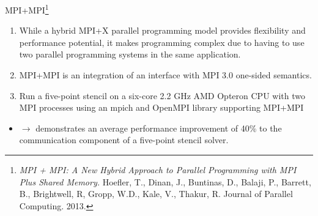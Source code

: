 \begin{frame}{MPI+MPI\footnote{\tiny {\it MPI + MPI: A New Hybrid Approach to Parallel Programming with MPI Plus Shared Memory.} Hoefler, T., Dinan, J., Buntinas, D., Balaji, P., Barrett, B., Brightwell, R, Gropp, W.D., Kale, V., Thakur, R.  Journal of 	Parallel Computing. 2013.}}
\vspace*{-.1in}
\begin{enumerate}
  \footnotesize \item \footnotesize {} While a hybrid MPI+X parallel programming model provides flexibility and performance potential, it makes programming complex due to having to use two parallel programming systems in the same application.
   \item \footnotesize {} MPI+MPI is an integration of an interface with MPI 3.0 one-sided semantics. 
   \item \footnotesize {} Run a five-point stencil on a six-core 2.2 GHz AMD Opteron CPU with two MPI processes using an mpich and OpenMPI library supporting MPI+MPI
\end{enumerate}
\vspace*{-0.3in}
\begin{figure}[ht!]
\label{fig:stencilMPIMPIbgq}
\end{figure}
\vspace*{-.15in}
\begin{itemize}
 \item[] \footnotesize $\rightarrow$ demonstrates an average performance improvement of 40\% to the communication component of a five-point stencil solver.
\end{itemize}
\end{frame} 